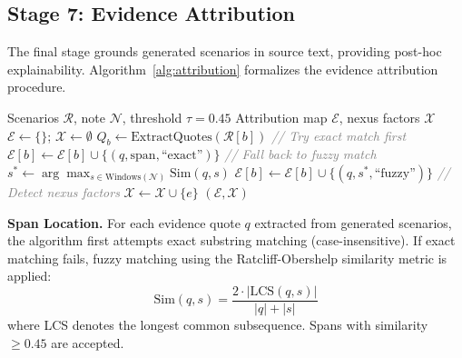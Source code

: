 \documentclass[conference]{IEEEtran}
\begin{document}
\subsection{Stage 7: Evidence Attribution}

The final stage grounds generated scenarios in source text, providing post-hoc explainability. Algorithm~\ref{alg:attribution} formalizes the evidence attribution procedure.

\begin{algorithm}[h]
\caption{Evidence Attribution with Nexus Detection}
\label{alg:attribution}
\begin{algorithmic}[1]
\REQUIRE Scenarios $\mathcal{R}$, note $\mathcal{N}$, threshold $\tau = 0.45$
\ENSURE Attribution map $\mathcal{E}$, nexus factors $\mathcal{X}$
\STATE $\mathcal{E} \leftarrow \{\}$; $\mathcal{X} \leftarrow \emptyset$
    \STATE $Q_b \leftarrow \text{ExtractQuotes}(\mathcal{R}[b])$
        \STATE \textcolor{gray}{\textit{// Try exact match first}}
            \STATE $\mathcal{E}[b] \leftarrow \mathcal{E}[b] \cup \{(q, \text{span}, \text{``exact''})\}$
        \ELSE
            \STATE \textcolor{gray}{\textit{// Fall back to fuzzy match}}
            \STATE $s^* \leftarrow \arg\max_{s \in \text{Windows}(\mathcal{N})} \text{Sim}(q, s)$
                \STATE $\mathcal{E}[b] \leftarrow \mathcal{E}[b] \cup \{(q, s^*, \text{``fuzzy''})\}$
            \ENDIF
        \ENDIF
    \ENDFOR
\ENDFOR
\STATE \textcolor{gray}{\textit{// Detect nexus factors}}
        \STATE $\mathcal{X} \leftarrow \mathcal{X} \cup \{e\}$
    \ENDIF
\ENDFOR
\RETURN $(\mathcal{E}, \mathcal{X})$
\end{algorithmic}
\end{algorithm}

\textbf{Span Location.} For each evidence quote $q$ extracted from generated scenarios, the algorithm first attempts exact substring matching (case-insensitive). If exact matching fails, fuzzy matching using the Ratcliff-Obershelp similarity metric is applied:
\begin{equation}
    \text{Sim}(q, s) = \frac{2 \cdot |\text{LCS}(q, s)|}{|q| + |s|}
\end{equation}
where LCS denotes the longest common subsequence. Spans with similarity $\geq 0.45$ are accepted.
\end{document}
